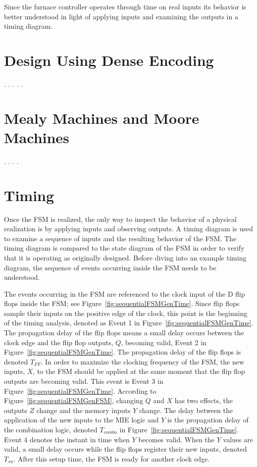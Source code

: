 Since the furnace controller operates through time on real
inputs its behavior is better understood in light of applying 
inputs and examining the outputs in a timing diagram.


\section{Design Using Dense Encoding}
\pagebreak
.
\pagebreak
.
\pagebreak
.
\pagebreak
.
\pagebreak
.

\section{Mealy Machines and Moore Machines}
\pagebreak
.
\pagebreak
.
\pagebreak
.
\pagebreak
.

\section{Timing}
Once the FSM is realized, the only way to inspect the behavior of a physical
realization is by applying inputs and observing outputs.  A timing 
diagram is used to examine a sequence of inputs and the resulting behavior of the FSM.
The timing diagram is compared to the state diagram of the FSM in order 
to verify that it is operating as originally designed.  Before diving into an 
example timing diagram,  the sequence of events
occurring  inside the FSM needs to be understood.

The events occurring in the FSM are referenced to the clock input of the 
D flip flops inside the FSM; see Figure~\ref{fig:sequentialFSMGenTime}.  Since flip
flops sample their inputs on the positive edge of the clock, this point is the
beginning of the timing analysis, denoted as Event 1 in 
Figure~\ref{fig:sequentialFSMGenTime}.  The propagation delay of the flip flops means 
a small delay occurs between the clock edge and the flip flop outputs, $Q$,
becoming valid, Event 2 in Figure~\ref{fig:sequentialFSMGenTime}.  The propagation delay 
of the flip flops is denoted $T_{FF}$.  In order to maximize the clocking 
frequency of the FSM, the new inputs, $X$, to the FSM should be applied at the
same moment that the flip flop outputs are becoming valid.  This event is Event 3
in Figure~\ref{fig:sequentialFSMGenTime}. According to Figure~\ref{fig:sequentialFSMGenFSM}, changing
$Q$ and $X$ has two effects, the outputs $Z$ change and the memory
inputs $Y$ change.  The delay between the application of the new inputs to
the MIE logic and $Y$ is the propagation delay of the combination logic, denoted
$T_{combo}$ in Figure~\ref{fig:sequentialFSMGenTime}.  Event 4 denotes the instant in time
when $Y$ becomes valid.  When the $Y$ values are valid, a small
delay occurs while the flip flops register their new inputs, denoted $T_{su}$.  After 
this setup time, the FSM is ready for another clock edge.  

